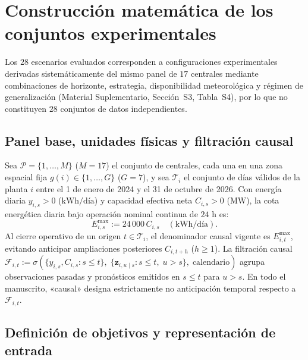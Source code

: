 \section{Construcción matemática de los conjuntos experimentales}\label{sec:conjuntos}

Los $28$ escenarios evaluados corresponden a configuraciones experimentales derivadas sistemáticamente del mismo panel de $17$ centrales mediante combinaciones de horizonte, estrategia, disponibilidad meteorológica y régimen de generalización (Material Suplementario, Sección~S3, Tabla~S4), por lo que no constituyen $28$ conjuntos de datos independientes.

\subsection{Panel base, unidades físicas y filtración causal}

Sea $\mathcal{P} = \{1,\dots,M\}$ ($M=17$) el conjunto de centrales, cada una en una zona espacial fija $g(i) \in \{1,\dots,G\}$ ($G=7$), y sea $\mathcal{T}_i$ el conjunto de días válidos de la planta $i$ entre el 1 de enero de 2024 y el 31 de octubre de 2026. Con energía diaria $y_{i,s} > 0$ ($\text{kWh/día}$) y capacidad efectiva neta $C_{i,s} > 0$ ($\text{MW}$), la cota energética diaria bajo operación nominal continua de $24\text{ h}$ es:
\begin{equation}
E^{\max}_{i,s} := 24\,000\,C_{i,s} \quad (\text{kWh/día}).
\label{eq:emax}
\end{equation}
Al cierre operativo de un origen $t \in \mathcal{T}_i$, el denominador causal vigente es $E^{\max}_{i,t}$, evitando anticipar ampliaciones posteriores $C_{i,t+h}$ ($h \ge 1$). La filtración causal $\mathcal{F}_{i,t} := \sigma(\{y_{i,s}, C_{i,s} : s \le t\},\; \{\mathbf{z}_{i,u \mid s} : s \le t,\; u > s\},\; \text{calendario})$ agrupa observaciones pasadas y pronósticos emitidos en $s \le t$ para $u > s$. En todo el manuscrito, «causal» designa estrictamente no anticipación temporal respecto a $\mathcal{F}_{i,t}$.

\subsection{Definición de objetivos y representación de entrada}

